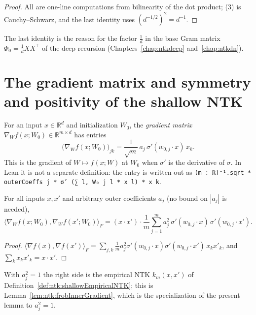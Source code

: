 \begin{proof}
  \leanok
All are one-line computations from bilinearity of the dot product; (3) is Cauchy--Schwarz, and the last identity uses $(d^{-1/2})^2=d^{-1}$.
\end{proof}

The last identity is the reason for the factor $\frac1d$ in the base Gram matrix $\Phi_0=\frac1dXX^\top$ of the deep recursion (Chapters~\ref{chap:ntkdeep} and~\ref{chap:ntkdn}).


\section{The gradient matrix and symmetry and positivity of the shallow NTK}\label{sec:ntkhelp:gradient}

\begin{definition}\label{def:ntkhelp:gradientMatrix}
  \leanok
For an input $x\in\mathbb R^d$ and initialization $W_0$, the \emph{gradient matrix} $\nabla_Wf(x;W_0)\in\mathbb R^{m\times d}$ has entries
\[
  \bigl(\nabla_Wf(x;W_0)\bigr)_{jk}=\frac1{\sqrt m}\,a_j\,\sigma'(w_{0,j}\cdot x)\,x_k .
\]
This is the gradient of $W\mapsto f(x;W)$ at $W_0$ when $\sigma'$ is the derivative of $\sigma$. In Lean it is not a separate definition: the entry is written out as \texttt{(m : ℝ)⁻¹.sqrt * outerCoeffs j * σ' (∑ l, W₀ j l * x l) * x k}.
\end{definition}

\begin{lemma}\label{lem:ntkhelp:frobGradient}
  \leanok
For all inputs $x,x'$ and arbitrary outer coefficients $a_j$ (no bound on $|a_j|$ is needed),
\[
  \bigl\langle\nabla_Wf(x;W_0),\nabla_Wf(x';W_0)\bigr\rangle_F=(x\cdot x')\cdot\frac1m\sum_{j=1}^ma_j^2\,\sigma'(w_{0,j}\cdot x)\,\sigma'(w_{0,j}\cdot x').
\]
\end{lemma}

\begin{proof}
  \leanok
$\langle\nabla f(x),\nabla f(x')\rangle_F=\sum_{j,k}\frac1m a_j^2\sigma'(w_{0,j}\cdot x)\sigma'(w_{0,j}\cdot x')\,x_kx'_k$, and $\sum_kx_kx'_k=x\cdot x'$.
\end{proof}

With $a_j^2=1$ the right side is the empirical NTK $k_m(x,x')$ of Definition~\ref{def:ntk:shallowEmpiricalNTK}; this is Lemma~\ref{lem:ntk:frobInnerGradient}, which is the specialization of the present lemma to $a_j^2=1$.

